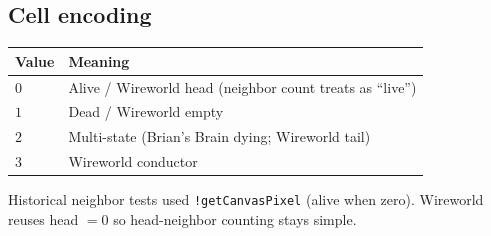 \subsection{Cell encoding}
\begin{center}
\begin{tabular}{@{}ll@{}}
\toprule
\textbf{Value} & \textbf{Meaning} \\
\midrule
$0$ & Alive / Wireworld head (neighbor count treats as ``live'') \\
$1$ & Dead / Wireworld empty \\
$2$ & Multi-state (Brian's Brain dying; Wireworld tail) \\
$3$ & Wireworld conductor \\
\bottomrule
\end{tabular}
\end{center}
Historical neighbor tests used \texttt{!getCanvasPixel} (alive when zero).
Wireworld reuses head $=0$ so head-neighbor counting stays simple.
